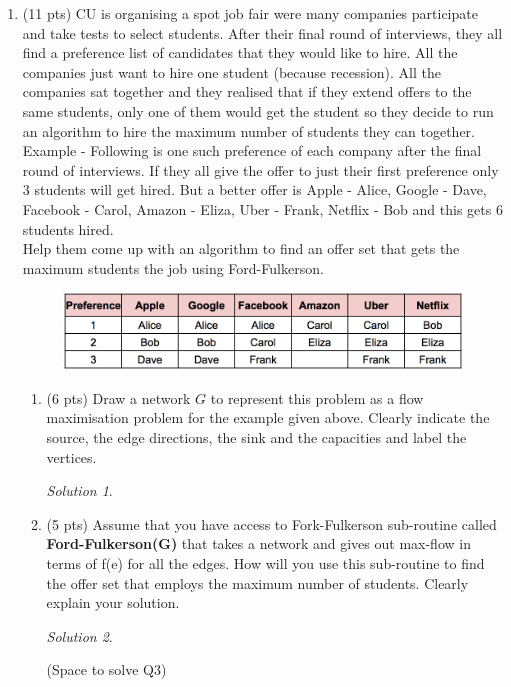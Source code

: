 \documentclass[12pt]{article}
\theoremstyle{remark}
\newtheorem*{solution}{Solution}
\begin{document}
\begin{enumerate}
\item (11 pts) CU is organising a spot job fair were many companies participate and take tests to select students. After their final round of interviews, they all find a preference list of candidates that they would like to hire. All the companies just want to hire one student (because recession). All the companies sat together and they realised that if they extend offers to the same students, only one of them would get the student so they decide to run an algorithm to hire the maximum number of students they can together. \\
Example - Following is one such preference of each company after the final round of interviews. If they all give the offer to just their first preference only 3 students will get hired. But a better offer is Apple - Alice, Google - Dave, Facebook - Carol, Amazon - Eliza, Uber - Frank, Netflix - Bob and this gets 6 students hired. \\

Help them come up with an algorithm to find an offer set that gets the maximum students the job using Ford-Fulkerson.
\begin{figure}[h!]
\begin{center}
\includegraphics[scale=0.8]{Job.png}
\end{center}
\end{figure}

\begin{enumerate}
    \item (6 pts) Draw a network $G$ to represent this problem as a flow maximisation problem for the example given above. Clearly indicate the source, the edge directions, the sink and the capacities and label the vertices.
\begin{solution}

\end{solution}

    
    \item (5 pts) Assume that you have access to Fork-Fulkerson sub-routine called \textbf{Ford-Fulkerson(G)} that takes a network and gives out max-flow in terms of f(e) for all the edges. How will you use this sub-routine to find the offer set that employs the maximum number of students. Clearly explain your solution.

\begin{solution}

\end{solution}
\pagebreak
(Space to solve Q3)

\end{enumerate}

\end{enumerate}
\end{document}
